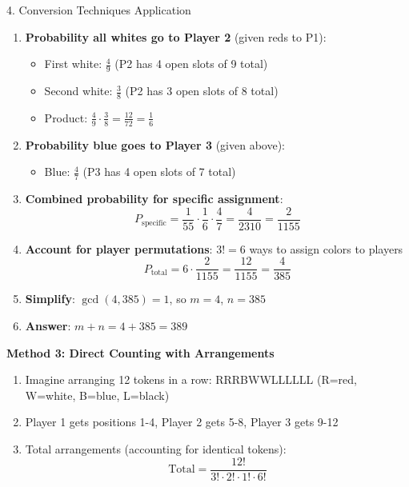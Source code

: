 \documentclass[12pt]{article}
\begin{document}
\begin{conversionbox}{4. Conversion Techniques Application}
\begin{enumerate}
    \item \textbf{Probability all whites go to Player 2} (given reds to P1):
    \begin{itemize}
        \item First white: $\frac{4}{9}$ (P2 has 4 open slots of 9 total)
        \item Second white: $\frac{3}{8}$ (P2 has 3 open slots of 8 total)
        \item Product: $\frac{4}{9} \cdot \frac{3}{8} = \frac{12}{72} = \frac{1}{6}$
    \end{itemize}
    
    \item \textbf{Probability blue goes to Player 3} (given above):
    \begin{itemize}
        \item Blue: $\frac{4}{7}$ (P3 has 4 open slots of 7 total)
    \end{itemize}
    
    \item \textbf{Combined probability for specific assignment}:
    \[P_{\text{specific}} = \frac{1}{55} \cdot \frac{1}{6} \cdot \frac{4}{7} = \frac{4}{2310} = \frac{2}{1155}\]
    
    \item \textbf{Account for player permutations}: $3! = 6$ ways to assign colors to players
    \[P_{\text{total}} = 6 \cdot \frac{2}{1155} = \frac{12}{1155} = \frac{4}{385}\]
    
    \item \textbf{Simplify}: $\gcd(4, 385) = 1$, so $m = 4$, $n = 385$
    
    \item \textbf{Answer}: $m + n = 4 + 385 = 389$
\end{enumerate}

\textbf{Method 3: Direct Counting with Arrangements}

\begin{enumerate}
    \item Imagine arranging 12 tokens in a row: RRRBWWLLLLLL (R=red, W=white, B=blue, L=black)
    
    \item Player 1 gets positions 1-4, Player 2 gets 5-8, Player 3 gets 9-12
    
    \item Total arrangements (accounting for identical tokens):
    \[\text{Total} = \frac{12!}{3! \cdot 2! \cdot 1! \cdot 6!}\]
    

\end{enumerate}
\end{conversionbox}
\end{document}
